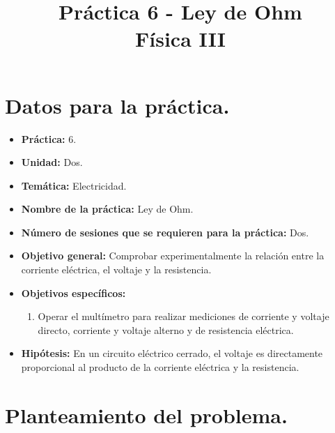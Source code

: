 \documentclass[14pt]{extarticle}
\title{\vspace*{-2cm} Práctica 6 - Ley de Ohm\\  Física III \vspace{-5ex}}
\date{}
\begin{document}
\maketitle

\section{Datos para la práctica.}

\begin{itemize}
\itemsep0em 
\item  \textbf{Práctica:} 6.
\item \textbf{Unidad:} Dos.
\item \textbf{Temática:} Electricidad.
\item \textbf{Nombre de la práctica:} Ley de Ohm.
\item \textbf{Número de sesiones que se requieren para la práctica:} Dos.
\item \textbf{Objetivo general: } Comprobar experimentalmente la relación entre la corriente eléctrica, el voltaje y la resistencia.
\item \textbf{Objetivos específicos: }
\begin{enumerate}
\item Operar el multímetro para realizar mediciones de corriente y voltaje directo, corriente y voltaje alterno y de resistencia eléctrica.
\end{enumerate}
\item \textbf{Hipótesis: } En un circuito eléctrico cerrado, el voltaje es directamente proporcional al producto de la corriente eléctrica y la resistencia. 
\end{itemize}

\section{Planteamiento del problema.} 
\end{document}
